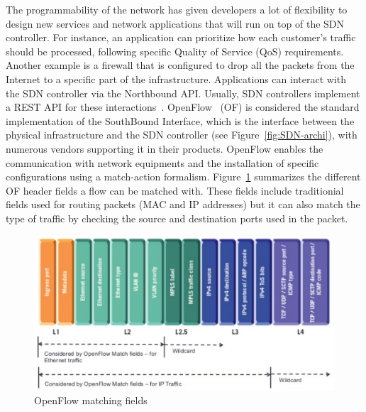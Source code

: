 The programmability of the network has given developers a lot of flexibility to design new services and network applications that will run on top of the SDN controller.
For instance, an application can prioritize how each customer's traffic should be processed, following specific Quality of Service (QoS) requirements.
Another example is a firewall that is configured to drop all the packets from the Internet to a specific part of the infrastructure.
Applications can interact with the SDN controller via the Northbound API.
Usually, SDN controllers implement a REST API for these interactions~\cite{onos-Berde2014a,opendaylight,floodlight}.
OpenFlow~\cite{Openflow-McKeown2008} (OF) is considered the standard implementation of the SouthBound Interface, which is the interface between the physical infrastructure and the SDN controller (see Figure~\ref{fig:SDN-archi}), with numerous vendors supporting it in their products.
OpenFlow enables the communication with network equipments and the installation of specific configurations using a match-action formalism.
Figure~\ref{fig:matching-fields} summarizes the different OF header fields a flow can be matched with.
These fields include traditionial fields used for routing packets (\eg MAC and IP addresses) but it can also match the type of traffic by checking the source and destination ports used in the packet.

\begin{figure}[h]
    \centering
    \includegraphics[scale=0.7]{figures/openflow-matchfields.pdf}
    \caption{OpenFlow matching fields~\cite{openflow-matchfields}}
    \label{fig:matching-fields}
\end{figure}

